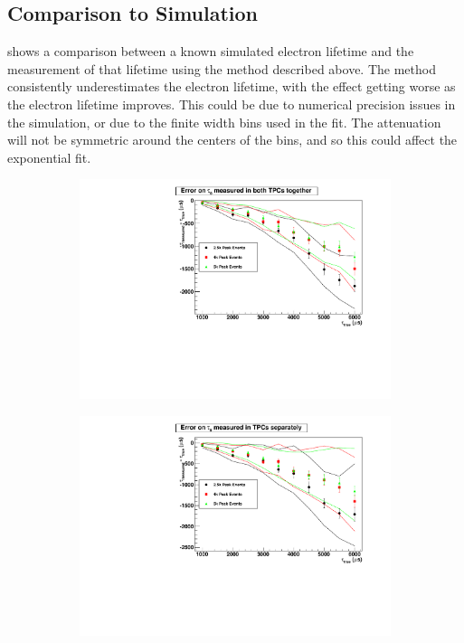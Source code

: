\documentclass[herrin-thesis.tex]{subfiles}
\begin{document}
\subsection{Comparison to Simulation}

 shows a comparison between a known simulated electron lifetime and the measurement of that lifetime using the method described above. The method consistently underestimates the electron lifetime, with the effect getting worse as the electron lifetime improves. This could be due to numerical precision issues in the simulation, or due to the finite width bins used in the fit. The attenuation will not be symmetric around the centers of the bins, and so this could affect the exponential fit.

\begin{figure}[htbp]
\begin{subfigure}[b]{0.5\linewidth}
\centering
\includegraphics[width=1.0\columnwidth]{./plots/el_sim_error_both.pdf}
\end{subfigure}%
\begin{subfigure}[b]{0.5\linewidth}
\centering
\includegraphics[width=1.0\columnwidth]{./plots/el_sim_error_indiv.pdf}

\end{subfigure}
\end{figure}
\end{document}
